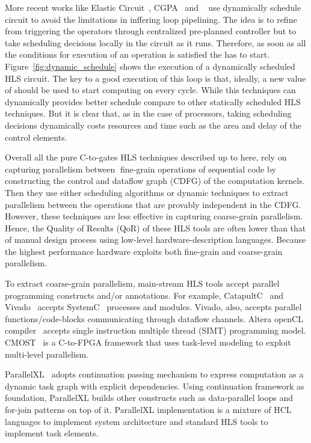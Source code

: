 More recent works like Elastic Circuit~\cite{elasticCircuit, elasticFlow}, CGPA~\cite{cgpa} and ~\cite{josipovic_fpga_2018_dynamically} use dynamically schedule circuit to avoid the limitations in inffering loop pipelining.
The idea is to refine from triggering the operators through centralized pre-planned controller but to take scheduling decisions locally in the circuit as it runs.
Therefore, as soon as all the conditions for execution of an operation is satisfied the has to start.
Figure~\ref{fig:dynamic_schedule} shows the execution of a dynamically scheduled HLS circuit.
The key to a good execution of this loop is that, ideally, a new value of  should be used to start computing  on every cycle.
While this techniques can dynamically provides better schedule compare to other statically scheduled HLS techniques.
But it is clear that, as in the case of processors, taking scheduling decisions dynamically costs resources and time such as the area and delay of the control elements.



Overall all the pure C-to-gates HLS techniques described up to here, rely on capturing parallelism between fine-grain operations of sequential code by constructing the control and dataflow graph (CDFG) of the computation kernels.
Then they use either scheduling algorithms or dynamic techniques to extract parallelism between the operations that are provably independent in the CDFG.
However, these techniques are less effective in capturing coarse-grain parallelism.
Hence, the Quality of Results (QoR) of these HLS tools are often lower than that of manual design process using low-level hardware-description languages.
Because the highest performance hardware exploits both fine-grain and coarse-grain parallelism.

To extract coarse-grain parallelism, main-stream HLS tools accept parallel programming constructs and/or annotations.
For example, CatapultC~\cite{catapult} and Vivado~\cite{vivado} accepts SystemC~\cite{systemc} processes and modules.
Vivado, also, accepts parallel functions/code-blocks communicating through dataflow channels.
Altera openCL compiler~\cite{opencl_sdk} accepts single instruction multiple thread (SIMT) programming model. 
CMOST~\cite{zhang_DAC_2015_cmost} is a C-to-FPGA framework that uses task-level modeling to exploit multi-level parallelism.

ParallelXL~\cite{chen_micro_2018_parallelXL} adopts continuation passing mechanism to express computation as a dynamic task graph with explicit dependencies.
Using continuation framework as foundation, ParallelXL builds other constructs such as data-parallel loops and for-join patterns on top of it.
ParallelXL implementation is a mixture of HCL languages to implement system architecture and standard HLS tools to implement task elements.

